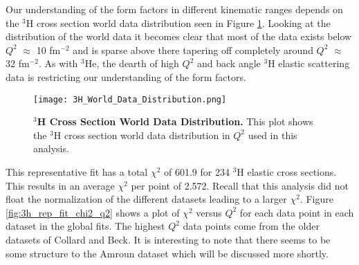 Our understanding of the form factors in different kinematic ranges depends on the $^3$H cross section world data distribution seen in Figure \ref{fig:3h_data_distribution}. Looking at the distribution of the world data it becomes clear that most of the data exists below $Q^2$ $\approx$ 10 fm$^{-2}$ and is sparse above there tapering off completely around $Q^2$ $\approx$ 32 fm$^{-2}$. As with $^3$He, the dearth of high $Q^2$ and back angle $^3$H elastic scattering data is restricting our understanding of the form factors.

\begin{figure}[!ht]
	\begin{center}
	\texttt{[image: 3H\_World\_Data\_Distribution.png]}
	\end{center}
	\caption[$^3$H Cross Section World Data Distribution]{
	{\bf{$^3$H Cross Section World Data Distribution.}} This plot shows the $^3$H cross section world data distribution in $Q^2$ used in this analysis.}
	\label{fig:3h_data_distribution}
\end{figure}



This representative fit has a total $\chi^2$ of 601.9 for 234 $^3$H elastic cross sections. This results in an average $\chi^2$ per point of 2.572. Recall that this analysis did not float the normalization of the different datasets leading to a larger $\chi^2$. Figure \ref{fig:3h_rep_fit_chi2_q2} shows a plot of $\chi^2$ versus $Q^2$ for each data point in each dataset in the global fits. The highest $Q^2$ data points come from the older datasets of Collard and Beck. It is interesting to note that there seems to be some structure to the Amroun dataset which will be discussed more shortly. 

